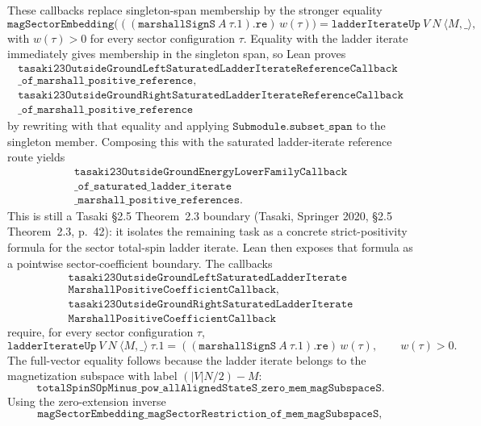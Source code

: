 \documentclass[a4paper,11pt]{article}
\begin{document}
These callbacks replace singleton-span membership by the stronger equality
\[
\texttt{magSectorEmbedding}\bigl(
  ((\texttt{marshallSignS}\ A\ \tau.1).\texttt{re})\,w(\tau)
\bigr)
= \texttt{ladderIterateUp}\ V\ N\ \langle M,\_\rangle ,
\]
with \(w(\tau)>0\) for every sector configuration \(\tau\).  Equality with
the ladder iterate immediately gives membership in the singleton span, so Lean
proves
\[
\begin{gathered}
\texttt{tasaki23OutsideGroundLeftSaturatedLadderIterateReferenceCallback}\\
\texttt{\_of\_marshall\_positive\_reference},\\
\texttt{tasaki23OutsideGroundRightSaturatedLadderIterateReferenceCallback}\\
\texttt{\_of\_marshall\_positive\_reference}
\end{gathered}
\]
by rewriting with that equality and applying
\(\texttt{Submodule.subset\_span}\) to the singleton member.  Composing this
with the saturated ladder-iterate reference route yields
\[
\begin{gathered}
\texttt{tasaki23OutsideGroundEnergyLowerFamilyCallback}\\
\texttt{\_of\_saturated\_ladder\_iterate}\\
\texttt{\_marshall\_positive\_references}.
\end{gathered}
\]
This is still a Tasaki §2.5 Theorem~2.3 boundary (Tasaki, Springer 2020,
§2.5 Theorem~2.3, p.~42): it isolates the remaining task as a concrete
strict-positivity formula for the sector total-spin ladder iterate.
Lean then exposes that formula as a pointwise sector-coefficient boundary.
The callbacks
\[
\begin{gathered}
\texttt{tasaki23OutsideGroundLeftSaturatedLadderIterate}\\
\texttt{MarshallPositiveCoefficientCallback},\\
\texttt{tasaki23OutsideGroundRightSaturatedLadderIterate}\\
\texttt{MarshallPositiveCoefficientCallback}
\end{gathered}
\]
require, for every sector configuration \(\tau\),
\[
\texttt{ladderIterateUp}\ V\ N\ \langle M,\_\rangle\ \tau.1
=
((\texttt{marshallSignS}\ A\ \tau.1).\texttt{re})\,w(\tau),
\qquad w(\tau)>0.
\]
The full-vector equality follows because the ladder iterate belongs to the
magnetization subspace with label
\((|V|N/2)-M\):
\[
\texttt{totalSpinSOpMinus\_pow\_allAlignedStateS\_zero\_mem\_magSubspaceS}.
\]
Using the zero-extension inverse
\[
\texttt{magSectorEmbedding\_magSectorRestriction\_of\_mem\_magSubspaceS},
\]
\end{document}
